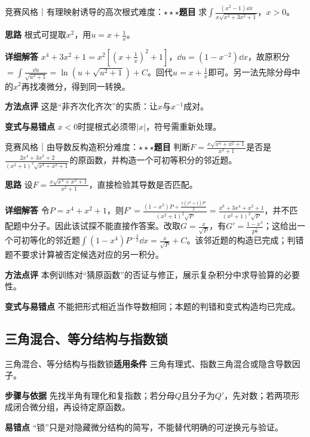 \begin{example}{竞赛风格｜有理映射诱导的高次根式}{难度：$\star\star\star$}\label{deep:ex:integral_source_deep:pseudo2}\textbf{题目} 求$\int \frac{(x^2-1)\dd x}{x\sqrt{x^4+3x^2+1}}$，$x>0$。\par\textbf{思路} 根式可提取$x^2$，用$u=x+\frac{1}{x}$。\par\textbf{详细解答} $x^4+3x^2+1=x^2[(x+\frac{1}{x})^2+1]$，$\dd u=(1-x^{-2})\dd x$，故原积分$=\int\frac{\dd u}{\sqrt{u^2+1}}=\ln(u+\sqrt{u^2+1})+C$。回代$u=x+\frac{1}{x}$即可。另一法先除分母中的$x^2$再找凑微分，得到同一转换。\par\textbf{方法点评} 这是“非齐次化齐次”的实质：让$x$与$x^{-1}$成对。\par\textbf{变式与易错点} $x<0$时提根式必须带$|x|$，符号需重新处理。\end{example}

\begin{example}{竞赛风格｜由导数反构造积分}{难度：$\star\star\star$}\label{deep:ex:integral_source_deep:exactalg}\textbf{题目} 判断$F=\frac{x\sqrt{x^4+x^2+1}}{x^2+1}$是否是$\frac{2x^4+3x^2+2}{(x^2+1)^2\sqrt{x^4+x^2+1}}$的原函数，并构造一个可初等积分的邻近题。\par\textbf{思路} 设$F=\frac{x\sqrt{x^4+x^2+1}}{x^2+1}$，直接检验其导数是否匹配。\par\textbf{详细解答} 令$P=x^4+x^2+1$，则$F'=\frac{(1-x^2)P+\frac{x(x^2+1)P'}{2}}{(x^2+1)^2\sqrt P}=\frac{x^6+3x^4+x^2+1}{(x^2+1)^2\sqrt P}$，并不匹配题中分子。因此该试探不能直接作答案。改取$G=\frac{x}{\sqrt P}$，有$G'=\frac{1-x^4}{P^{\frac{3}{2}}}$；这给出一个可初等化的邻近题$\int(1-x^4)P^{-\frac{3}{2}}\dd x=\frac{x}{\sqrt P}+C$。该邻近题的构造已完成；判错题不要求计算被否定候选对应的另一积分。\par\textbf{方法点评} 本例训练对“猜原函数”的否证与修正，展示复杂积分中求导验算的必要性。\par\textbf{变式与易错点} 不能把形式相近当作导数相同；本题的判错和变式构造均已完成。\end{example}

\subsection{三角混合、等分结构与指数锁}\label{deep:integral_source_deep:trig}

\begin{method}{三角混合、等分结构与指数锁}\textbf{适用条件} 三角有理式、指数三角混合或隐含导数因子。\par\textbf{步骤与依据} 先找半角有理化和复指数；若分母$Q$且分子为$Q'$，先对数；若两项形成闭合微分组，再设待定原函数。\par\textbf{易错点} “锁”只是对隐藏微分结构的简写，不能替代明确的可逆换元与验证。\end{method}

